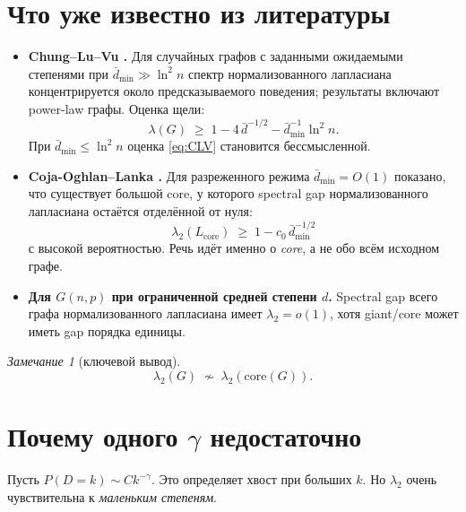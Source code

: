 \documentclass[11pt,a4paper]{article}
\theoremstyle{plain}
\theoremstyle{definition}
\theoremstyle{remark}
\newtheorem{remark}[theorem]{Замечание}
\newcommand{\core}{\mathrm{core}}
\newcommand{\dbar}{\bar d}
\newcommand{\lamtwo}{\lambda_2}
\begin{document}
\section{Что уже известно из литературы}
\label{sec:known}

\begin{itemize}[leftmargin=*]
\item \textbf{Chung--Lu--Vu \cite{ChungLuVu2003}.} Для случайных графов с
заданными ожидаемыми степенями при $\dbar_{\min}\gg\ln^2 n$ спектр
нормализованного лапласиана концентрируется около предсказываемого поведения;
результаты включают power-law графы. Оценка щели:
\begin{equation}
\lambda(G)\;\ge\;1-4\,\dbar^{-1/2}-\dbar_{\min}^{-1}\ln^2 n .
\label{eq:CLV}
\end{equation}
При $\dbar_{\min}\le\ln^2 n$ оценка \eqref{eq:CLV} становится бессмысленной.

\item \textbf{Coja-Oghlan--Lanka \cite{CojaLanka2009}.} Для разреженного режима
$\dbar_{\min}=O(1)$ показано, что существует большой core, у которого
spectral gap нормализованного лапласиана остаётся отделённой от нуля:
\begin{equation}
\lamtwo(L_{\core})\;\ge\;1-c_0\,\dbar_{\min}^{-1/2}
\label{eq:COL}
\end{equation}
с высокой вероятностью. Речь идёт именно о \emph{core}, а не обо всём исходном
графе.

\item \textbf{Для $G(n,p)$ при ограниченной средней степени $d$.} Spectral gap
всего графа нормализованного лапласиана имеет $\lamtwo=o(1)$, хотя
giant/core может иметь gap порядка единицы.
\end{itemize}

\begin{remark}[ключевой вывод]
\begin{equation}
\boxed{\;\lamtwo(G)\;\not\sim\;\lamtwo(\core(G)).\;}
\end{equation}
\end{remark}

\section{Почему одного $\gamma$ недостаточно}
\label{sec:gamma}

Пусть $P(D=k)\sim Ck^{-\gamma}$. Это определяет хвост при больших $k$. Но
$\lamtwo$ очень чувствительна к \emph{маленьким степеням}.
\end{document}
